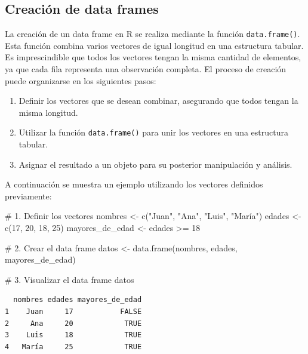\documentclass[
  spanish,
  a4paper,
  DIV=11,
  numbers=noendperiod,
  onepage,
  openany]{scrreprt}
\newenvironment{Shaded}{\begin{snugshade}}{\end{snugshade}}
\newcommand{\CommentTok}[1]{\textcolor[rgb]{0.37,0.37,0.37}{#1}}
\newcommand{\DecValTok}[1]{\textcolor[rgb]{0.68,0.00,0.00}{#1}}
\newcommand{\FunctionTok}[1]{\textcolor[rgb]{0.28,0.35,0.67}{#1}}
\newcommand{\NormalTok}[1]{\textcolor[rgb]{0.00,0.23,0.31}{#1}}
\newcommand{\OtherTok}[1]{\textcolor[rgb]{0.00,0.23,0.31}{#1}}
\newcommand{\SpecialCharTok}[1]{\textcolor[rgb]{0.37,0.37,0.37}{#1}}
\newcommand{\StringTok}[1]{\textcolor[rgb]{0.13,0.47,0.30}{#1}}
\begin{document}
\subsection{Creación de data frames}\label{creaciuxf3n-de-data-frames}

La creación de un data frame en R se realiza mediante la función
\texttt{data.frame()}. Esta función combina varios vectores de igual
longitud en una estructura tabular. Es imprescindible que todos los
vectores tengan la misma cantidad de elementos, ya que cada fila
representa una observación completa. El proceso de creación puede
organizarse en los siguientes pasos:

\begin{enumerate}
\def\labelenumi{\arabic{enumi}.}
\item
  Definir los vectores que se desean combinar, asegurando que todos
  tengan la misma longitud.
\item
  Utilizar la función \texttt{data.frame()} para unir los vectores en
  una estructura tabular.
\item
  Asignar el resultado a un objeto para su posterior manipulación y
  análisis.
\end{enumerate}

A continuación se muestra un ejemplo utilizando los vectores definidos
previamente:

\begin{Shaded}
\begin{Highlighting}[]
\CommentTok{\# 1. Definir los vectores}
\NormalTok{nombres }\OtherTok{\textless{}{-}} \FunctionTok{c}\NormalTok{(}\StringTok{"Juan"}\NormalTok{, }\StringTok{"Ana"}\NormalTok{, }\StringTok{"Luis"}\NormalTok{, }\StringTok{"María"}\NormalTok{)}
\NormalTok{edades }\OtherTok{\textless{}{-}} \FunctionTok{c}\NormalTok{(}\DecValTok{17}\NormalTok{, }\DecValTok{20}\NormalTok{, }\DecValTok{18}\NormalTok{, }\DecValTok{25}\NormalTok{)}
\NormalTok{mayores\_de\_edad }\OtherTok{\textless{}{-}}\NormalTok{ edades }\SpecialCharTok{\textgreater{}=} \DecValTok{18}

\CommentTok{\# 2. Crear el data frame}
\NormalTok{datos }\OtherTok{\textless{}{-}} \FunctionTok{data.frame}\NormalTok{(nombres, edades, mayores\_de\_edad)}

\CommentTok{\# 3. Visualizar el data frame}
\NormalTok{datos}
\end{Highlighting}
\end{Shaded}

\begin{verbatim}
  nombres edades mayores_de_edad
1    Juan     17           FALSE
2     Ana     20            TRUE
3    Luis     18            TRUE
4   María     25            TRUE
\end{verbatim}
\end{document}
